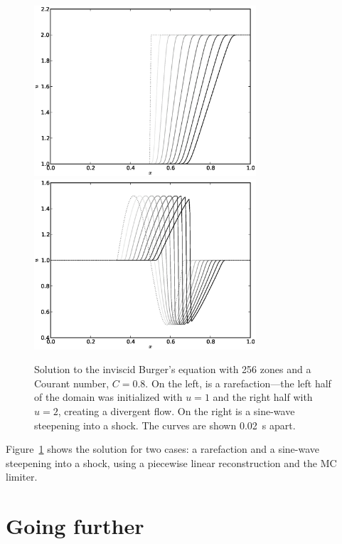 \begin{figure}[t]
\centering
\includegraphics[width=3.25in]{fv-burger-rarefaction}
\includegraphics[width=3.25in]{fv-burger-sine}
\caption[Solutions to the inviscid Burger's
  equation.]{\label{fig:burgers} Solution to the inviscid Burger's
  equation with 256 zones and a Courant number, $C = 0.8$.  On the
  left, is a rarefaction---the left half of the domain was initialized
  with $u = 1$ and the right half with $u = 2$, creating a divergent
  flow.  On the right is a sine-wave steepening into a shock.  The
  curves are shown 0.02~s apart.}
\end{figure}

Figure~\ref{fig:burgers} shows the solution for two cases: a rarefaction
and a sine-wave steepening into a shock, using a piecewise linear
reconstruction and the MC limiter.


\section{Going further}

